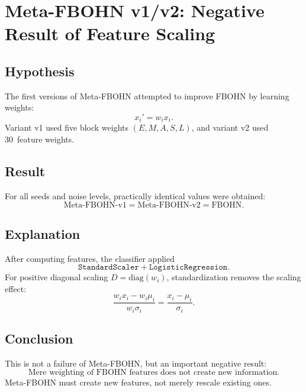 \section{Meta-FBOHN v1/v2: Negative Result of Feature Scaling}
\label{sec:meta_fbohn_v1v2}

\subsection{Hypothesis}
The first versions of Meta-FBOHN attempted to improve FBOHN by learning weights:
\[
x_i' = w_i x_i.
\]
Variant v1 used five block weights $(E,M,A,S,L)$, and variant v2 used 30~feature weights.

\subsection{Result}
For all seeds and noise levels, practically identical values were obtained:
\[
\text{Meta-FBOHN-v1}=\text{Meta-FBOHN-v2}=\text{FBOHN}.
\]

\subsection{Explanation}
After computing features, the classifier applied
\[
\texttt{StandardScaler}+\texttt{LogisticRegression}.
\]
For positive diagonal scaling $D=\mathrm{diag}(w_i)$, standardization removes the scaling effect:
\[
\frac{w_ix_i-w_i\mu_i}{w_i\sigma_i}=\frac{x_i-\mu_i}{\sigma_i}.
\]

\subsection{Conclusion}
This is not a failure of Meta-FBOHN, but an important negative result:
\[
\boxed{\text{Mere weighting of FBOHN features does not create new information.}}
\]
Meta-FBOHN must create new features, not merely rescale existing ones.
